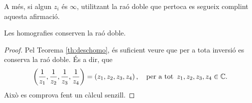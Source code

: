 \documentclass[dvipsnames, svgnames, leqno, a4paper, 12pt]{article}
\begin{document}
        A més, si algun $z_i$ és $\infty$, utilitzant la raó doble que pertoca es segueix complint aquesta afirmació.

    \begin{proposition}
        Les homografies conserven la raó doble.
    \end{proposition}

    \begin{proof}
        Pel Teorema \ref{th:deschomo}, és suficient veure que per a tota inversió es conserva la raó doble. És a dir, que 
        \begin{displaymath}
            \left( \frac{1}{z_1}, \frac{1}{z_2}, \frac{1}{z_3}, \frac{1}{z_4} \right)=\left( z_1, z_2, z_3, z_4 \right),\quad \text{per a tot }\, z_1,z_2,z_3,z_4\in\mathbb{C}.
        \end{displaymath}
        Això es comprova fent un càlcul senzill.
    \end{proof}
\end{document}
